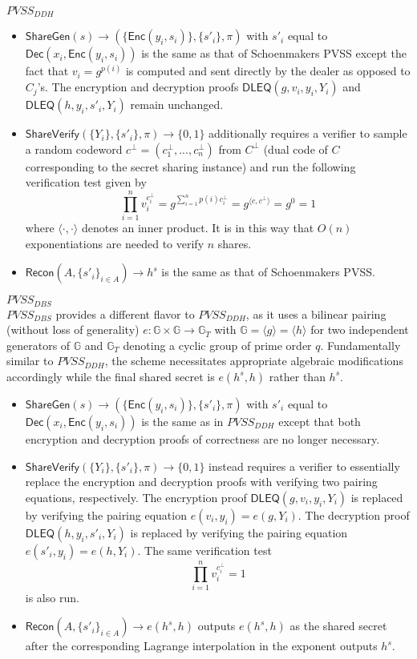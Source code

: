 \documentclass[letterpaper,twocolumn,10pt]{article}
\theoremstyle{definition}
\theoremstyle{remark}
\begin{document}
\noindent\underline{$PVSS_{DDH}$}
\begin{itemize}
\item $\mathsf{ShareGen}(s) \rightarrow (\{\mathsf{Enc}(y_i, s_i)\}, \{s'_i\}, \pi)$ with $s'_i$ equal to $\mathsf{Dec}(x_i, \mathsf{Enc}(y_i, s_i))$ is the same as that of Schoenmakers PVSS except the fact that $v_i = g^{p(i)}$ is computed and sent directly by the dealer as opposed to $C_j$'s. The encryption and decryption proofs $\mathsf{DLEQ}(g, v_i, y_i, Y_i)$ and $\mathsf{DLEQ}(h, y_i, s'_i, Y_i)$ remain unchanged.
\item $\mathsf{ShareVerify}(\{Y_i\}, \{s'_i\}, \pi) \rightarrow \{0, 1\}$ additionally requires a verifier to sample a random codeword $c^\perp = (c_1^\perp, ..., c_n^\perp)$ from $C^\perp$ (dual code of $C$ corresponding to the secret sharing instance) and run the following verification test given by
\[
\prod_{i = 1}^n v_i^{c_i^\perp} = g^{\sum_{i = 1}^n p(i) c_i^\perp} = g^{\langle c, c^\perp \rangle} = g^0 = 1
\]
where $\langle \cdot, \cdot \rangle$ denotes an inner product. It is in this way that $O(n)$ exponentiations are needed to verify $n$ shares.
\item $\mathsf{Recon}(A, \{s'_i\}_{i \in A}) \rightarrow h^s$ is the same as that of Schoenmakers PVSS.
\end{itemize}

\noindent\underline{$PVSS_{DBS}$}\\
$PVSS_{DBS}$ provides a different flavor to $PVSS_{DDH}$, as it uses a bilinear pairing (without loss of generality) $e: \mathbb{G} \times \mathbb{G} \rightarrow \mathbb{G}_T$ with $\mathbb{G} = \langle g \rangle = \langle h \rangle$ for two independent generators of $\mathbb{G}$ and $\mathbb{G}_T$ denoting a cyclic group of prime order $q$. Fundamentally similar to $PVSS_{DDH}$, the scheme necessitates appropriate algebraic modifications accordingly while the final shared secret is $e(h^s, h)$ rather than $h^s$.
\begin{itemize}
\item $\mathsf{ShareGen}(s) \rightarrow (\{\mathsf{Enc}(y_i, s_i)\}, \{s'_i\}, \pi)$ with $s'_i$ equal to $\mathsf{Dec}(x_i, \mathsf{Enc}(y_i, s_i))$ is the same as in $PVSS_{DDH}$ except that both encryption and decryption proofs of correctness are no longer necessary.
\item $\mathsf{ShareVerify}(\{Y_i\}, \{s'_i\}, \pi) \rightarrow \{0, 1\}$ instead requires a verifier to essentially replace the encryption and decryption proofs with verifying two pairing equations, respectively. The encryption proof $\mathsf{DLEQ}(g, v_i, y_i, Y_i)$ is replaced by verifying the pairing equation $e(v_i, y_i) = e(g, Y_i)$. The decryption proof $\mathsf{DLEQ}(h, y_i, s'_i, Y_i)$ is replaced by verifying the pairing equation $e(s'_i, y_i) = e(h, Y_i)$. The same verification test
\[
\prod_{i = 1}^n v_i^{c_i^\perp} = 1
\]
is also run.
\item $\mathsf{Recon}(A, \{s'_i\}_{i \in A}) \rightarrow e(h^s, h)$ outputs $e(h^s, h)$ as the shared secret after the corresponding Lagrange interpolation in the exponent outputs $h^s$.
\end{itemize}
\end{document}
